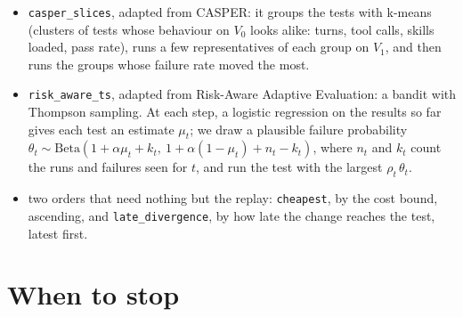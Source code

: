 \documentclass[11pt,a4paper]{article}
\newcommand{\strat}[1]{\texttt{#1}}
\begin{document}
\begin{itemize}
\begin{itemize}
          changes: $s_{tc} = \mathrm{clip}(r_k\, \ell_{tk}\, \phi_t(c)\, \tau_t,\ s_{\min},\ s_{\max})$, where $k$
          is the kind of $c$, $r_k$ is how often tests that touched past changes of kind $k$ revealed them,
          $\ell_{tk}$ is how much better than average $t$ did on that kind, and $\tau_t$ is a bonus when the test's
          text is close to the diff or its author declared the dependency;
    \item after each result, Bayes' rule gives the \emph{posterior}, the probability of each hypothesis given the
          results so far. Its \emph{entropy} $H(h)$ measures how unsure we still are about what is broken. The
          next test is the one whose result is expected to lower that uncertainty the most per token, tilted by
          risk: $\arg\max_t \frac{H(h) - \mathbb{E}[H(h \mid X_t)]}{c(t)}\, (1 + \gamma(\rho_t - 1))$;
    \item after a test passes, the sensitivity of near-duplicates of that test is multiplied by $\delta < 1$,
          since their passing would add little.
  \end{itemize}
  \item \strat{casper\_slices}, adapted from CASPER: it groups the tests with k-means (clusters of tests whose
        behaviour on $V_0$ looks alike: turns, tool calls, skills loaded, pass rate), runs a few representatives
        of each group on $V_1$, and then runs the groups whose failure rate moved the most.
  \item \strat{risk\_aware\_ts}, adapted from Risk-Aware Adaptive Evaluation: a bandit with Thompson sampling.
        At each step, a logistic regression on the results so far gives each test an estimate $\mu_t$; we draw a
        plausible failure probability $\theta_t \sim \mathrm{Beta}(1 + \alpha\mu_t + k_t,\ 1 + \alpha(1 - \mu_t) +
        n_t - k_t)$, where $n_t$ and $k_t$ count the runs and failures seen for $t$, and run the test with the
        largest $\rho_t\, \theta_t$.
  \item two orders that need nothing but the replay: \strat{cheapest}, by the cost bound, ascending, and
        \strat{late\_divergence}, by how late the change reaches the test, latest first.
\end{itemize}

\section{When to stop}
\label{sec:stop}
\end{document}
